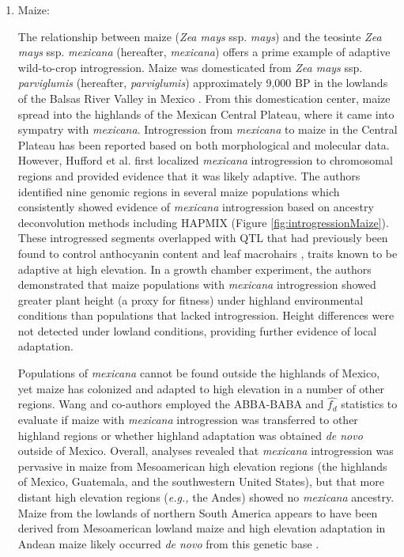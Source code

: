 \documentclass[11pt]{article}
\begin{document}
\begin{enumerate}
\item{Maize:}

The relationship between maize (\emph{Zea mays} ssp. \emph{mays}) and the teosinte \emph{Zea mays} ssp. \emph{mexicana} (hereafter, \emph{mexicana}) offers a prime example of adaptive wild-to-crop introgression.
Maize was domesticated from \emph{Zea mays} ssp. \emph{parviglumis} (hereafter, \emph{parviglumis})  approximately 9,000 BP in the lowlands of the Balsas River Valley in Mexico \cite{matsuoka2002single}.
From this domestication center, maize spread into the highlands of the Mexican Central Plateau, where it came into sympatry with \emph{mexicana}.
Introgression from \emph{mexicana} to maize in the Central Plateau has been reported based on both morphological \cite {wilkes1977} and molecular \cite{vanHeerwaarden2011, doebley1987} data.
However, Hufford et al. \cite{Hufford2013} first localized \emph{mexicana} introgression to chromosomal regions and provided evidence that it was likely adaptive.
The authors identified nine genomic regions in several maize populations which consistently showed evidence of \emph{mexicana} introgression based on ancestry deconvolution methods including HAPMIX (Figure \ref{fig:introgressionMaize}).
These introgressed segments overlapped with QTL that had previously been found to control anthocyanin content and leaf macrohairs \cite{lauter2004}, traits known to be adaptive at high elevation.
In a growth chamber experiment, the authors demonstrated that maize populations with \emph{mexicana} introgression showed greater plant height (a proxy for fitness) under highland environmental conditions than populations that lacked introgression.
Height differences were not detected under lowland conditions, providing further evidence of local adaptation.


Populations of \emph{mexicana} cannot be found outside the highlands of Mexico, yet maize has colonized and adapted to high elevation in a number of other regions.
Wang and co-authors \cite{Wang2017} employed the ABBA-BABA and $\hat{f_{d}}$ statistics to evaluate if maize with \emph{mexicana} introgression was transferred to other highland regions or whether highland adaptation was obtained \emph{de novo} outside of Mexico.
Overall, analyses revealed that  \emph{mexicana} introgression was pervasive in maize from Mesoamerican high elevation regions (the highlands of Mexico, Guatemala, and the southwestern United States), but that more distant high elevation regions (\emph{e.g.,} the Andes) showed no \emph{mexicana} ancestry.
Maize from the lowlands of northern South America appears to have been derived from Mesoamerican lowland maize and high elevation adaptation in Andean maize likely occurred \emph{de novo} from this genetic base \cite{Takuno2015}.



\end{enumerate}
\end{document}
